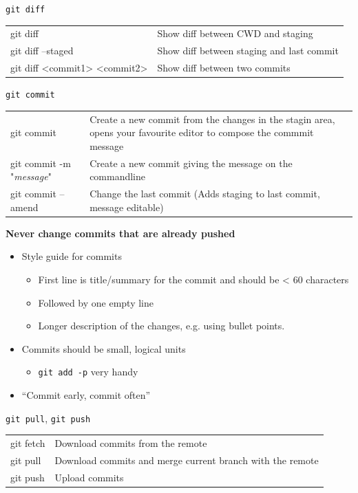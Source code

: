 \begin{frame}{\texttt{git diff}}
  \begin{tabu}{>{\ttfamily}l X[,L]}
    git diff                     & Show diff between CWD and staging\\
    git diff --staged            & Show diff between staging and last commit \\
    git diff <commit1> <commit2> & Show diff between two commits
  \end{tabu}
\end{frame}

\begin{frame}{\texttt{git commit}}
  \begin{tabu}{>{\ttfamily}l X[,L]}
    git commit                       & Create a new commit from the changes in the stagin area, opens your favourite editor to compose the commmit message \\
    git commit -m "\textit{message}" & Create a new commit giving the message on the commandline \\
    git commit --amend               & Change the last commit (Adds staging to last commit, message editable)
  \end{tabu}
  \alert{\bfseries Never change commits that are already pushed}

  \begin{itemize}
    \item Style guide for commits
      \begin{itemize}
        \item First line is title/summary for the commit and should be < 60 characters
        \item Followed by one empty line
        \item Longer description of the changes, e.g. using bullet points.
      \end{itemize}
    \item Commits should be small, logical units
      \begin{itemize}
        \item \texttt{git add -p} very handy
      \end{itemize}
    \item \enquote{Commit early, commit often}
  \end{itemize}
\end{frame}

\begin{frame}{\texttt{git pull}, \texttt{git push}}
  \begin{tabu}{>{\ttfamily}l X[,L]}
    git fetch  & Download commits from the remote \\
    git pull   & Download commits and merge current branch with the remote \\
    git push   & Upload commits
  \end{tabu}
\end{frame}


